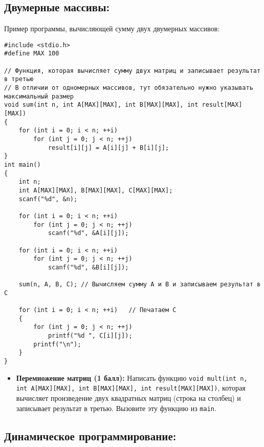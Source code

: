 \documentclass{article}
\begin{document}
\subsection*{Двумерные массивы:}
Пример программы, вычисляющей сумму двух двумерных массивов:
\begin{lstlisting}
#include <stdio.h>
#define MAX 100

// Функция, которая вычисляет сумму двух матриц и записывает результат в третью
// В отличии от одномерных массивов, тут обязательно нужно указывать максимальный размер
void sum(int n, int A[MAX][MAX], int B[MAX][MAX], int result[MAX][MAX])
{
    for (int i = 0; i < n; ++i)
        for (int j = 0; j < n; ++j)
            result[i][j] = A[i][j] + B[i][j];
}
int main()
{
    int n;
    int A[MAX][MAX], B[MAX][MAX], C[MAX][MAX];
    scanf("%d", &n);
    
    for (int i = 0; i < n; ++i)
        for (int j = 0; j < n; ++j)
            scanf("%d", &A[i][j]);
         
    for (int i = 0; i < n; ++i)
        for (int j = 0; j < n; ++j)
            scanf("%d", &B[i][j]);
            
    sum(n, A, B, C); // Вычисляем сумму A и B и записываем результат в C
    
    for (int i = 0; i < n; ++i)   // Печатаем C
    {
        for (int j = 0; j < n; ++j)
            printf("%d ", C[i][j]);
        printf("\n");
    }
}
\end{lstlisting}
\begin{itemize}
\item \textbf{Перемножение матриц (1 балл):} Написать функцию \texttt{void mult(int n, int A[MAX][MAX], int B[MAX][MAX], int result[MAX][MAX])}, которая вычисляет произведение двух квадратных матриц (строка на столбец) и записывает результат в третью. Вызовите эту функцию из \texttt{main}.
\end{itemize}


\newpage
\subsection*{Динамическое программирование:}
\end{document}
